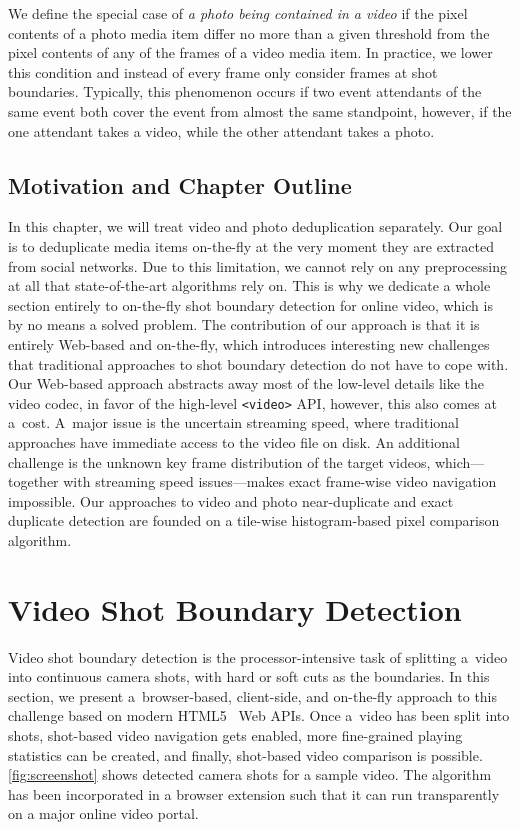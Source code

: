 We define the special case of
\emph{a photo being contained in a video} if the pixel contents
of a photo media item differ no more than a given threshold from
the pixel contents of any of the frames of a video media item.
In practice, we lower this condition and instead of every frame
only consider frames at shot boundaries.
Typically, this phenomenon occurs if two event attendants
of the same event both cover the event from almost the same
standpoint, however, if the one attendant takes a video,
while the other attendant takes a photo.

\subsection{Motivation and Chapter Outline}

In this chapter, we will treat video
and photo deduplication separately. 
Our goal is to deduplicate media items on-the-fly
at the very moment they are extracted from social networks.
Due to this limitation, we cannot rely on any preprocessing
at all that state-of-the-art algorithms rely on.
This is why we dedicate a whole section entirely to on-the-fly
shot boundary detection for online video,
which is by no means a solved problem.
The contribution of our approach is that it is entirely Web-based
and on-the-fly, which introduces interesting new challenges
that traditional approaches to shot boundary detection
do not have to cope with.
Our Web-based approach abstracts away most of the low-level details
like the video codec, in favor of the high-level \texttt{<video>}
API, however, this also comes at a~cost.
A~major issue is the uncertain streaming speed,
where traditional approaches have immediate access
to the video file on disk.
An additional challenge is the unknown key frame distribution
of the target videos, which---together with streaming speed
issues---makes exact frame-wise video navigation impossible.
Our approaches to video and photo near-duplicate
and exact duplicate detection are founded
on a tile-wise histogram-based pixel comparison algorithm.

\section{Video Shot Boundary Detection}
Video shot boundary detection is the processor-intensive task
of splitting a~video into continuous camera shots,
with hard or soft cuts as the boundaries.
In this section, we present a~browser-based, client-side, and
on-the-fly approach to this challenge
based on modern HTML5~\cite{berjon2012html5} Web APIs.
Once a~video has been split into shots,
shot-based video navigation gets enabled,
more fine-grained playing statistics can be created,
and finally, shot-based video comparison is possible.
\autoref{fig:screenshot} shows detected camera
shots for a sample video.
The algorithm has been incorporated in a browser extension
such that it can run transparently on a major online video portal.

